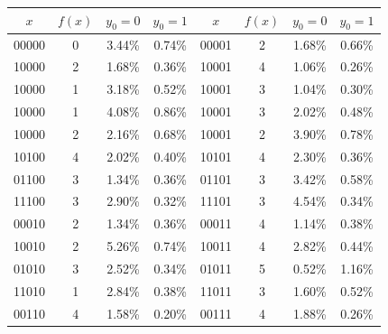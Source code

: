 \documentclass[reqno, 12pt]{amsart}
\numberwithin{equation}{section}                %
\begin{document}
\begin{table}[ht]
   \begin{tabular}{|c|c|c|c||c|c|c|c|}
      \hline
      $x$ & $f (x)$ & $y_0 = 0$ & $y_0 = 1$ & $x$ & $f (x)$ & $y_0 = 0$ & $y_0 = 1$ \\
      \hline
      00000 & 0 & {\color{ForestGreen} 3.44\%} & {\color{Red} 0.74\%} & 00001 & 2 & {\color{ForestGreen} 1.68\%} & {\color{Red} 0.66\%} \\
      10000 & 2 & {\color{ForestGreen} 1.68\%} & {\color{Red} 0.36\%} & 10001 & 4 & {\color{ForestGreen} 1.06\%} & {\color{Red} 0.26\%} \\
      10000 & 1 & {\color{ForestGreen} 3.18\%} & {\color{Red} 0.52\%} & 10001 & 3 & {\color{ForestGreen} 1.04\%} & {\color{Red} 0.30\%} \\
      10000 & 1 & {\color{ForestGreen} 4.08\%} & {\color{Red} 0.86\%} & 10001 & 3 & {\color{ForestGreen} 2.02\%} & {\color{Red} 0.48\%} \\
      10000 & 2 & {\color{ForestGreen} 2.16\%} & {\color{Red} 0.68\%} & 10001 & 2 & {\color{ForestGreen} 3.90\%} & {\color{Red} 0.78\%} \\
      10100& 4 & {\color{ForestGreen} 2.02\%} & {\color{Red} 0.40\%} & 10101 & 4 & {\color{ForestGreen} 2.30\%} & {\color{Red} 0.36\%} \\
      01100 & 3 & {\color{ForestGreen} 1.34\%} & {\color{Red} 0.36\%} & 01101 & 3 & {\color{ForestGreen} 3.42\%} & {\color{Red} 0.58\%} \\
      11100 & 3 & {\color{ForestGreen} 2.90\%} & {\color{Red} 0.32\%} & 11101 & 3 & {\color{ForestGreen} 4.54\%} & {\color{Red} 0.34\%} \\
      00010 & 2 & {\color{ForestGreen} 1.34\%} & {\color{Red} 0.36\%} & 00011 & 4 & {\color{ForestGreen} 1.14\%} & {\color{Red} 0.38\%} \\
      10010 & 2 & {\color{ForestGreen} 5.26\%} & {\color{Red} 0.74\%} & 10011 & 4 & {\color{ForestGreen} 2.82\%} & {\color{Red} 0.44\%} \\
      01010 & 3 & {\color{ForestGreen} 2.52\%} & {\color{Red} 0.34\%} & 01011 & 5 & {\color{Red} 0.52\%} & {\color{ForestGreen} 1.16\%} \\
      11010 & 1 & {\color{ForestGreen} 2.84\%} & {\color{Red} 0.38\%} & 11011 & 3 & {\color{ForestGreen} 1.60\%} & {\color{Red} 0.52\%} \\
      00110 & 4 & {\color{ForestGreen} 1.58\%} & {\color{Red} 0.20\%} & 00111 & 4 & {\color{ForestGreen} 1.88\%} & {\color{Red} 0.26\%} \\

\end{tabular}
\end{table}
\end{document}
